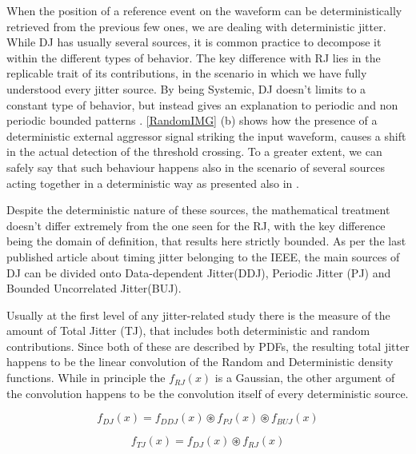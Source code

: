 When the position of a reference event on the waveform can be deterministically retrieved from the previous few ones, we are dealing with deterministic jitter. While DJ has usually several sources, it is common practice to decompose it within the different types of behavior.
The key difference with RJ lies in the replicable trait of its contributions, in the scenario in which we have fully understood every jitter source.
By being Systemic, DJ doesn't limits to a constant type of behavior, but instead gives an explanation to periodic and non periodic bounded patterns \cite{General_IEEE}. 
\autoref{RandomIMG} (b) shows how the presence of a deterministic external aggressor signal striking the input waveform, causes a shift in the actual detection of the threshold crossing. To a greater extent, we can safely say that such behaviour happens also in the scenario of several sources acting together in a deterministic way as presented also in \cite{Crosstalk_IEEE1}.


Despite the deterministic nature of these sources, the mathematical treatment doesn't differ extremely from the one seen for the RJ, with the key difference being the domain of definition, that results here strictly bounded. As per the last published article about timing jitter belonging to the IEEE, the main sources of DJ can be divided onto Data-dependent Jitter(DDJ), Periodic Jitter (PJ) and Bounded Uncorrelated Jitter(BUJ).

Usually at the first level of any jitter-related study there is the measure of the amount of Total Jitter (TJ), that includes both deterministic and random contributions. Since both of these are described by PDFs, the resulting total jitter happens to be the linear convolution of the Random and Deterministic density functions.
While in principle the $f_{RJ}(x)$ is a Gaussian, the other argument of the convolution happens to be the convolution itself of every deterministic source. 

\begin{equation}
f_{DJ}(x) = f_{DDJ}(x) \circledast f_{PJ}(x) \circledast f_{BUJ}(x) 
\label{eq:DetJitterConvo}
\end{equation}

\begin{equation}
f_{TJ}(x) = f_{DJ}(x) \circledast f_{RJ}(x) 
\label{eq:TOTjitterConvo}
\end{equation}




